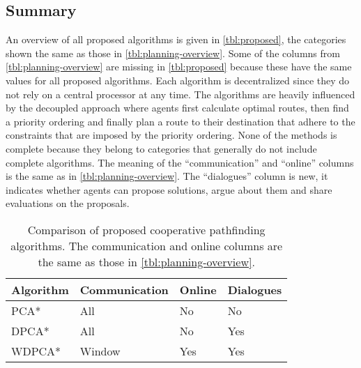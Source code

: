 \subsection{Summary}
An overview of all proposed algorithms is given in \autoref{tbl:proposed}, the
categories shown the same as those in \autoref{tbl:planning-overview}. Some
of the columns from \autoref{tbl:planning-overview} are missing in
\autoref{tbl:proposed} because these have the same values for all proposed
algorithms. Each algorithm is decentralized since they do not rely on a
central processor at any time. The algorithms are heavily influenced by the
decoupled approach where agents first calculate optimal routes, then
find a priority ordering and finally plan a route to their destination that
adhere to the constraints that are imposed by the priority ordering. None of
the methods is complete because they belong to categories that generally do not
include complete algorithms. The meaning of the ``communication'' and 
``online'' columns is the same as in \autoref{tbl:planning-overview}. The 
``dialogues'' column is new, it indicates whether agents can propose solutions, 
argue about them and share evaluations on the proposals.

\begin{table}
    \centering
    \caption{Comparison of proposed cooperative pathfinding algorithms. The
    communication and online columns are the same as those in
    \autoref{tbl:planning-overview}.}
    \label{tbl:proposed}
    \begin{tabular}{l|l|l|l}
        Algorithm & Communication & Online & Dialogues \\ \hline
        PCA*   & All & No & No \\
        DPCA*  & All & No & Yes \\
        WDPCA* & Window & Yes & Yes \\
    \end{tabular}
\end{table}